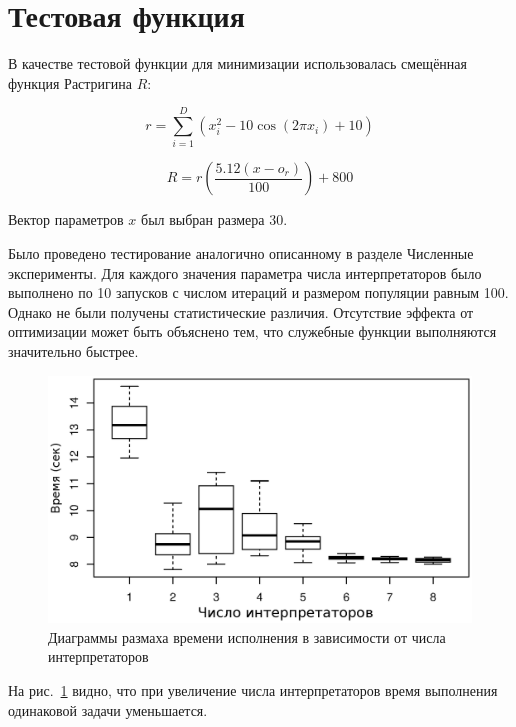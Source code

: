 \section*{Тестовая функция}

В качестве тестовой функции для минимизации
использовалась смещённая функция Растригина $R$:

\begin{equation*}
    r = \sum_{i = 1}^{D}(x_i^2 - 10\cos(2 \pi x_i) + 10)
\end{equation*}

\begin{equation*}
    R = r\left(\frac{5.12 (x - o_r)}{100}\right) + 800
\end{equation*}

Вектор параметров $x$ был выбран размера 30.

Было проведено тестирование
аналогично описанному в разделе
Численные эксперименты.
Для каждого значения параметра
числа интерпретаторов было выполнено
по 10 запусков
с числом итераций и размером популяции
равным 100.
Однако не были получены
статистические различия.
Отсутствие эффекта
от оптимизации может
быть объяснено тем,
что служебные функции
выполняются значительно быстрее.

\begin{figure}[h]
\includegraphics{rastrigin}
\caption{Диаграммы размаха времени исполнения
в зависимости от числа интерпретаторов}
\label{fig:rastriginboxplot}
\end{figure}

На рис.~\ref{fig:rastriginboxplot} видно,
что при увеличение числа интерпретаторов
время выполнения одинаковой задачи уменьшается.

